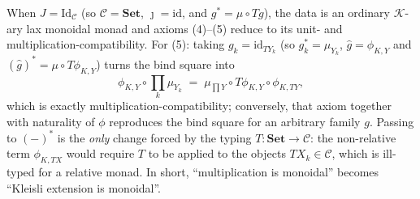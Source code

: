 %
%
%



\begin{remark}
When $J=\mathrm{Id}_{\mathcal{C}}$ (so $\mathcal{C}=\mathbf{Set}$,
$\jmath=\mathrm{id}$, and $g^{*}=\mu\circ Tg$), the data is an ordinary
$\mathcal{K}$-ary lax monoidal monad and axioms (4)--(5) reduce to its unit-
and multiplication-compatibility. For (5): taking $g_k=\mathrm{id}_{TY_k}$ (so
$g_k^{*}=\mu_{Y_k}$, $\widehat{g}=\phi_{K,Y}$ and
$(\widehat g)^{*}=\mu\circ T\phi_{K,Y}$) turns the bind square into
\[
  \phi_{K,Y}\circ\textstyle\prod_k\mu_{Y_k}
  \;=\;
  \mu_{\prod Y}\circ T\phi_{K,Y}\circ\phi_{K,TY},
\]
which is exactly multiplication-compatibility; conversely, that axiom together
with naturality of $\phi$ reproduces the bind square for an arbitrary family
$g$. Passing to $(-)^{*}$ is the \emph{only} change forced by the typing
$T\colon\mathbf{Set}\to\mathcal{C}$: the non-relative term $\phi_{K,TX}$ would
require $T$ to be applied to the objects $TX_k\in\mathcal{C}$, which is
ill-typed for a relative monad. In short, ``multiplication is monoidal''
becomes ``Kleisli extension is monoidal''.
\end{remark}

